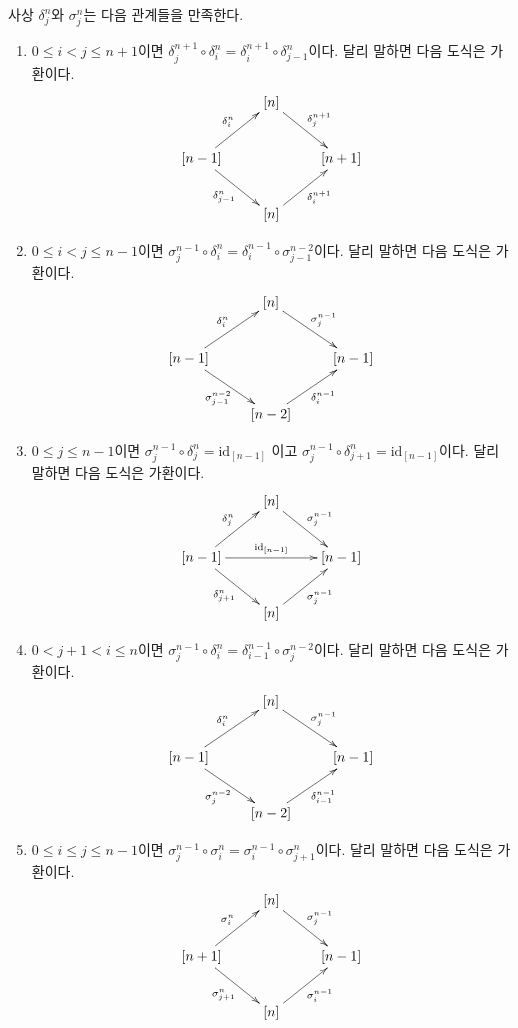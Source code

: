 \begin{lemma}
\label{lemma-relations-face-degeneracy}
사상 $\delta^n_j$와 $\sigma^n_j$는 다음 관계들을 만족한다.
\begin{enumerate}
\item $0 \leq i < j \leq n + 1$이면
$\delta^{n + 1}_j \circ \delta^n_i =
\delta^{n + 1}_i \circ \delta^n_{j - 1}$이다.
달리 말하면 다음 도식은 가환이다.
$$
\xymatrix{
& [n] \ar[rd]^{\delta^{n + 1}_j} & \\
[n - 1] \ar[ru]^{\delta^n_i} \ar[rd]_{\delta^n_{j - 1}} & &
[n + 1] \\
& [n] \ar[ru]_{\delta^{n + 1}_i} &
}
$$
\item $0 \leq i < j \leq n - 1$이면
$\sigma^{n - 1}_j \circ \delta^n_i =
\delta^{n - 1}_i \circ \sigma^{n - 2}_{j - 1}$이다.
달리 말하면 다음 도식은 가환이다.
$$
\xymatrix{
& [n] \ar[rd]^{\sigma^{n - 1}_j} & \\
[n - 1] \ar[ru]^{\delta^n_i} \ar[rd]_{\sigma^{n - 2}_{j - 1}} & &
[n - 1] \\
& [n - 2] \ar[ru]_{\delta^{n - 1}_i} &
}
$$
\item $0 \leq j \leq n - 1$이면
$\sigma^{n - 1}_j \circ \delta^n_j = \text{id}_{[n - 1]}$
이고
$\sigma^{n - 1}_j \circ \delta^n_{j + 1} = \text{id}_{[n - 1]}$이다.
달리 말하면 다음 도식은 가환이다.
$$
\xymatrix{
& [n] \ar[rd]^{\sigma^{n - 1}_j} & \\
[n - 1]
\ar[ru]^{\delta^n_j}
\ar[rd]_{\delta^n_{j + 1}}
\ar[rr]^{\text{id}_{[n - 1]}} & & [n - 1] \\
& [n] \ar[ru]_{\sigma^{n - 1}_j} &
}
$$
\item $0 < j + 1 < i \leq n$이면
$\sigma^{n - 1}_j \circ \delta^n_i =
\delta^{n - 1}_{i - 1} \circ \sigma^{n - 2}_j$이다.
달리 말하면 다음 도식은 가환이다.
$$
\xymatrix{
& [n] \ar[rd]^{\sigma^{n - 1}_j} & \\
[n - 1] \ar[ru]^{\delta^n_i} \ar[rd]_{\sigma^{n - 2}_j} & &
[n - 1] \\
& [n - 2] \ar[ru]_{\delta^{n - 1}_{i - 1}} &
}
$$
\item $0 \leq i \leq j \leq n - 1$이면
$\sigma^{n - 1}_j \circ \sigma^n_i =
\sigma^{n - 1}_i \circ \sigma^n_{j + 1}$이다.
달리 말하면 다음 도식은 가환이다.
$$
\xymatrix{
& [n] \ar[rd]^{\sigma^{n - 1}_j} & \\
[n + 1] \ar[ru]^{\sigma^n_i} \ar[rd]_{\sigma^n_{j + 1}} & &
[n - 1] \\
& [n] \ar[ru]_{\sigma^{n - 1}_i} &
}
$$
\end{enumerate}
\end{lemma}

